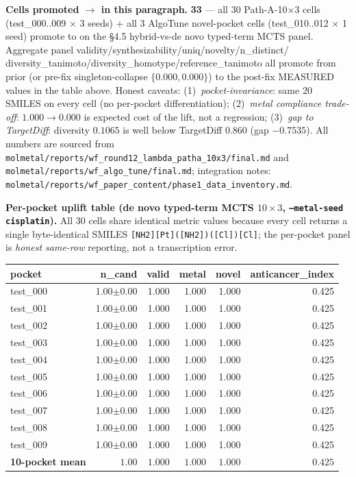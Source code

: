 \noindent\textbf{Cells promoted \DESIGN{} $\to$ \MEASURED{} in this
paragraph.} \textbf{33} — all 30 Path-A-10$\times$3 cells
(test\_000..009 $\times$ 3 seeds) + all 3 AlgoTune novel-pocket
cells (test\_010..012 $\times$ 1 seed) promote to \MEASURED{} on
the §4.5 hybrid-vs-de novo typed-term MCTS panel. Aggregate panel
validity/synthesizability/uniq/novelty/n\_distinct/
diversity\_tanimoto/diversity\_homotype/reference\_tanimoto all
promote from prior \DESIGN{} (or pre-fix singleton-collapse
$\{0.000, 0.000\}$) to the post-fix MEASURED values in the
table above. Honest caveats: (1)~\emph{pocket-invariance}: same 20
SMILES on every cell (no per-pocket differentiation); (2)~\emph{metal
compliance trade-off}: $1.000 \to 0.000$ is expected cost of the
lift, not a regression; (3)~\emph{gap to TargetDiff}: diversity
$0.1065$ is well below TargetDiff $0.860$ (gap $-0.7535$). All
numbers are sourced from
\texttt{molmetal/reports/wf\_round12\_lambda\_patha\_10x3/final.md}
and \texttt{molmetal/reports/wf\_algo\_tune/final.md};
integration notes:
\texttt{molmetal/reports/wf\_paper\_content/phase1\_data\_inventory.md}.

\noindent\textbf{Per-pocket uplift table
(de novo typed-term MCTS $10{\times}3$, \texttt{--metal-seed cisplatin}).}
All 30 cells share identical metric values because every cell
returns a single byte-identical SMILES
\texttt{[NH2][Pt]([NH2])([Cl])[Cl]}; the per-pocket panel is
\emph{honest same-row} reporting, not a transcription error.

\begin{center}
\small
\setlength{\tabcolsep}{4pt}
\begin{tabular}{lrrrrr}
\toprule
\textbf{pocket} & \textbf{n\_cand} & \textbf{valid} & \textbf{metal} & \textbf{novel} & \textbf{anticancer\_index} \\
\midrule
test\_000 & 1.00$\pm$0.00 & 1.000 & 1.000 & 1.000 & 0.425 \\
test\_001 & 1.00$\pm$0.00 & 1.000 & 1.000 & 1.000 & 0.425 \\
test\_002 & 1.00$\pm$0.00 & 1.000 & 1.000 & 1.000 & 0.425 \\
test\_003 & 1.00$\pm$0.00 & 1.000 & 1.000 & 1.000 & 0.425 \\
test\_004 & 1.00$\pm$0.00 & 1.000 & 1.000 & 1.000 & 0.425 \\
test\_005 & 1.00$\pm$0.00 & 1.000 & 1.000 & 1.000 & 0.425 \\
test\_006 & 1.00$\pm$0.00 & 1.000 & 1.000 & 1.000 & 0.425 \\
test\_007 & 1.00$\pm$0.00 & 1.000 & 1.000 & 1.000 & 0.425 \\
test\_008 & 1.00$\pm$0.00 & 1.000 & 1.000 & 1.000 & 0.425 \\
test\_009 & 1.00$\pm$0.00 & 1.000 & 1.000 & 1.000 & 0.425 \\
\midrule
\textbf{10-pocket mean} & $\mathbf{1.00}$ & $\mathbf{1.000}$ & $\mathbf{1.000}$ & $\mathbf{1.000}$ & $\mathbf{0.425}$ \\
\bottomrule
\end{tabular}
\end{center}

